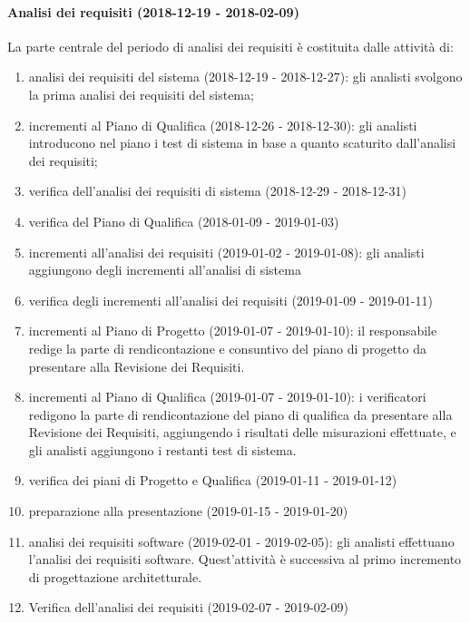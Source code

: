 		\paragraph{Analisi dei requisiti (2018-12-19 - 2018-02-09)\\} La parte centrale del periodo di analisi dei requisiti è costituita dalle attività di:
			\begin{enumerate}[label = 2.2.\arabic*)]
				\item analisi dei requisiti del sistema (2018-12-19 - 2018-12-27): gli analisti svolgono la prima analisi dei requisiti del sistema;
				\item incrementi al Piano di Qualifica (2018-12-26 - 2018-12-30): gli analisti introducono nel piano i test di sistema in base a quanto scaturito dall'analisi dei requisiti;
				\item verifica dell'analisi dei requisiti di sistema (2018-12-29 - 2018-12-31)
				\item verifica del Piano di Qualifica (2018-01-09 - 2019-01-03)
				\item incrementi all'analisi dei requisiti (2019-01-02 - 2019-01-08): gli analisti aggiungono degli incrementi all'analisi di sistema
				\item verifica degli incrementi all'analisi dei requisiti (2019-01-09 - 2019-01-11)
				\item incrementi al Piano di Progetto (2019-01-07 - 2019-01-10): il responsabile redige la parte di rendicontazione e consuntivo del piano di progetto da presentare alla Revisione dei Requisiti.
				\item incrementi al Piano di Qualifica (2019-01-07 - 2019-01-10): i verificatori redigono la parte di rendicontazione del piano di qualifica da presentare alla Revisione dei Requisiti, aggiungendo i risultati delle misurazioni effettuate, e gli analisti aggiungono i restanti test di sistema.
				\item verifica dei piani di Progetto e Qualifica (2019-01-11 - 2019-01-12)
				\item preparazione alla presentazione (2019-01-15 - 2019-01-20)
				\item analisi dei requisiti software (2019-02-01 - 2019-02-05): gli analisti effettuano l'analisi dei requisiti software. Quest'attività è successiva al primo incremento di progettazione architetturale.
				\item Verifica dell'analisi dei requisiti (2019-02-07 - 2019-02-09)				
			\end{enumerate}
	\newpage
